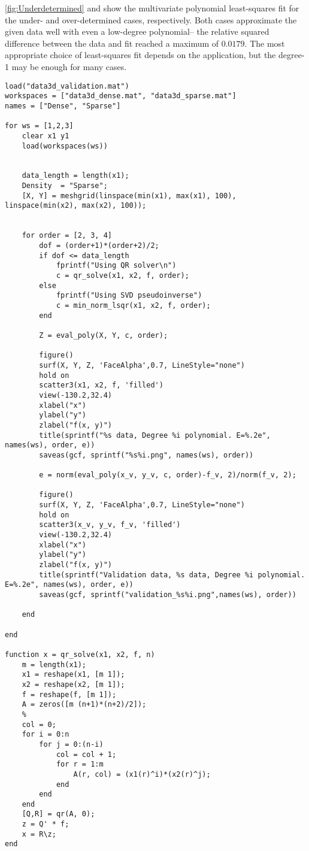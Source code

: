 \documentclass{template}
\begin{document}
\autoref{fig:Underdetermined} and  show the multivariate polynomial least-squares fit for the under- and over-determined cases, respectively. Both cases approximate the given data well with even a low-degree polynomial-- the relative squared difference between the data and fit reached a maximum of $0.0179$. The most appropriate choice of least-squares fit depends on the application, but the degree-1 may be enough for many cases.

\begin{verbatim}
load("data3d_validation.mat")
workspaces = ["data3d_dense.mat", "data3d_sparse.mat"]
names = ["Dense", "Sparse"]

for ws = [1,2,3]
    clear x1 y1 
    load(workspaces(ws))


    data_length = length(x1);
    Density  = "Sparse";
    [X, Y] = meshgrid(linspace(min(x1), max(x1), 100), linspace(min(x2), max(x2), 100));
    
    
    for order = [2, 3, 4]
        dof = (order+1)*(order+2)/2;
        if dof <= data_length
            fprintf("Using QR solver\n")
            c = qr_solve(x1, x2, f, order);
        else
            fprintf("Using SVD pseudoinverse")
            c = min_norm_lsqr(x1, x2, f, order);
        end
        
        Z = eval_poly(X, Y, c, order);
    
        figure()
        surf(X, Y, Z, 'FaceAlpha',0.7, LineStyle="none")
        hold on
        scatter3(x1, x2, f, 'filled')
        view(-130.2,32.4)
        xlabel("x")
        ylabel("y")
        zlabel("f(x, y)")
        title(sprintf("%s data, Degree %i polynomial. E=%.2e", names(ws), order, e))
        saveas(gcf, sprintf("%s%i.png", names(ws), order))

        e = norm(eval_poly(x_v, y_v, c, order)-f_v, 2)/norm(f_v, 2);

        figure()
        surf(X, Y, Z, 'FaceAlpha',0.7, LineStyle="none")
        hold on
        scatter3(x_v, y_v, f_v, 'filled')
        view(-130.2,32.4)
        xlabel("x")
        ylabel("y")
        zlabel("f(x, y)")
        title(sprintf("Validation data, %s data, Degree %i polynomial. E=%.2e", names(ws), order, e))
        saveas(gcf, sprintf("validation_%s%i.png",names(ws), order))

    end
    
end

function x = qr_solve(x1, x2, f, n)
    m = length(x1);
    x1 = reshape(x1, [m 1]);
    x2 = reshape(x2, [m 1]);
    f = reshape(f, [m 1]);
    A = zeros([m (n+1)*(n+2)/2]);
    %
    col = 0;
    for i = 0:n
        for j = 0:(n-i)
            col = col + 1;
            for r = 1:m
                A(r, col) = (x1(r)^i)*(x2(r)^j);
            end
        end
    end
    [Q,R] = qr(A, 0);
    z = Q' * f;
    x = R\z;
end


\end{verbatim}
\end{document}
